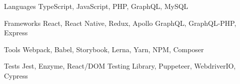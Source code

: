 

\begin{cvskills}

  \cvskill
    {Languages} %
    {TypeScript, JavaScript, PHP, GraphQL, MySQL} %

  \cvskill
    {Frameworks} %
    {React, React Native, Redux, Apollo GraphQL, GraphQL-PHP, Express} %

  \cvskill
    {Tools} %
    {Webpack, Babel, Storybook, Lerna, Yarn, NPM, Composer} %

  \cvskill
    {Tests} %
    {Jest, Enzyme, React/DOM Testing Library, Puppeteer, WebdriverIO, Cypress} %

\end{cvskills}

